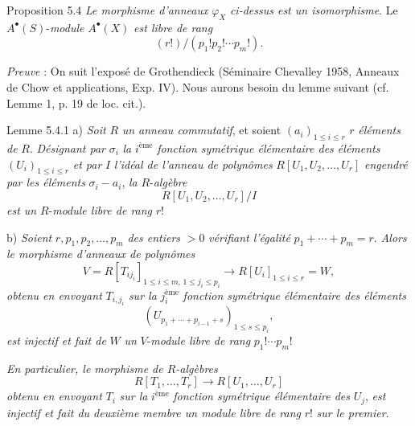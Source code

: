 \begin{statement}{Proposition 5.4}
\emph{Le morphisme d'anneaux} $\varphi_X$ \emph{ci-dessus est un isomorphisme}. Le $A^{\bullet}(S)$-\emph{module} $A^{\bullet}(X)$ \emph{est libre de rang}
\[
(r!)/(p_1!p_2!\cdots p_m!).
\]
\end{statement}

\emph{Preuve} : On
suit l'exposé de Grothendieck (Séminaire Chevalley 1958, Anneaux de Chow et applications, Exp. IV). Nous aurons besoin du lemme suivant (cf. Lemme 1, p. 19 de loc. cit.).

\begin{statement}{Lemme 5.4.1}
a) \emph{Soit} $R$ \emph{un anneau commutatif}, et soient $(a_i)_{1\le i\le r}$ $r$ \emph{éléments de} $R$. \emph{Désignant par} $\sigma_i$ \emph{la} $i^{\text{ème}}$ \emph{fonction symétrique élémentaire des éléments} $(U_i)_{1\le i\le r}$ \emph{et par} $I$ \emph{l'idéal de l'anneau de polynômes} $R[U_1,U_2,\ldots,U_r]$ \emph{engendré par les éléments} $\sigma_i-a_i$, \emph{la} $R$-\emph{algèbre}
\[
R[U_1,U_2,\ldots,U_r]/I
\]
\emph{est un} $R$-\emph{module libre de rang} $r!$

b) \emph{Soient} $r,p_1,p_2,\ldots,p_m$ \emph{des entiers} $>0$ \emph{vérifiant l'égalité} $p_1+\cdots+p_m=r$. \emph{Alors le morphisme d'anneaux de polynômes}
\[
V=R[T_{ij_i}]_{1\le i\le m,\,1\le j_i\le p_i}
\longrightarrow R[U_i]_{1\le i\le r}=W,
\]
\emph{obtenu en envoyant} $T_{i,j_i}$ \emph{sur la} $j_i^{\text{ème}}$ \emph{fonction symétrique élémentaire des éléments}
\[
(U_{p_1+\cdots+p_{i-1}+s})_{1\le s\le p_i},
\]
\emph{est injectif et fait de} $W$ \emph{un} $V$-\emph{module libre de rang} $p_1!\cdots p_m!$

\emph{En particulier, le morphisme de $R$-algèbres}
\[
R[T_1,\ldots,T_r]\to R[U_1,\ldots,U_r]
\]
\emph{obtenu en envoyant} $T_i$ \emph{sur la} $i^{\text{ème}}$ \emph{fonction symétrique élémentaire des} $U_j$, \emph{est injectif et fait du deuxième membre un module libre de rang} $r!$ \emph{sur le premier}.
\end{statement}


